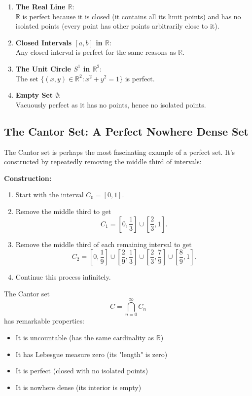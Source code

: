 \documentclass{article}
\begin{document}
\begin{enumerate}[label=\textbf{\arabic*.}]
    \item \textbf{The Real Line $\mathbb{R}$}: \\
    $\mathbb{R}$ is perfect because it is closed (it contains all its limit points) and has no isolated points (every point has other points arbitrarily close to it).
    
    \item \textbf{Closed Intervals $[a,b]$ in $\mathbb{R}$}: \\
    Any closed interval is perfect for the same reasons as $\mathbb{R}$.
    
    \item \textbf{The Unit Circle $S^1$ in $\mathbb{R}^2$}: \\
    The set $\{(x,y) \in \mathbb{R}^2 : x^2 + y^2 = 1\}$ is perfect.
    
    \item \textbf{Empty Set $\emptyset$}: \\
    Vacuously perfect as it has no points, hence no isolated points.
\end{enumerate}

\subsection{The Cantor Set: A Perfect Nowhere Dense Set} \label{cantor-set}

The Cantor set is perhaps the most fascinating example of a perfect set. It's constructed by repeatedly removing the middle third of intervals:

\textbf{Construction:}
\begin{enumerate}[label=\textbf{\arabic*.}]
    \item Start with the interval $C_0 = [0,1]$.
    \item Remove the middle third to get 
    \[
    C_1 = \left[0,\frac{1}{3}\right] \cup \left[\frac{2}{3},1\right].
    \]
    \item Remove the middle third of each remaining interval to get 
    \[
    C_2 = \left[0,\frac{1}{9}\right] \cup \left[\frac{2}{9},\frac{1}{3}\right] \cup \left[\frac{2}{3},\frac{7}{9}\right] \cup \left[\frac{8}{9},1\right].
    \]
    \item Continue this process infinitely.
\end{enumerate}

The Cantor set 
\[
C = \bigcap_{n=0}^{\infty} C_n
\]
has remarkable properties:
\begin{itemize}
    \item It is uncountable (has the same cardinality as $\mathbb{R}$)
    \item It has Lebesgue measure zero (its "length" is zero)
    \item It is perfect (closed with no isolated points)
    \item It is nowhere dense (its interior is empty)
\end{itemize}
\end{document}
